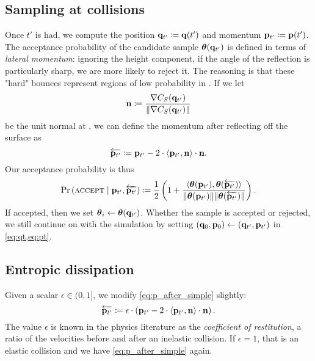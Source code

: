 \subsection{Sampling at collisions} \label{ss:sampling}

Once $t'$ is had, we compute the position $\mathbf{q}_{t'} \coloneqq \mathbf{q}(t')$ and
momentum $\mathbf{p}_{t'} \coloneqq \mathbf{p}(t')$. The acceptance probability of the
candidate sample $\boldsymbol{\theta}(\mathbf{q}_{t'})$ is defined in terms of \emph{lateral
momentum}: ignoring the height component, if the angle of the reflection is
particularly sharp, we are more likely to reject it. The reasoning is that these
"hard" bounces represent regions of low probability in \target{}. If we let
\begin{equation*}
    \mathbf{n} \coloneqq \frac{\nabla C_{S}({\mathbf{q}_{t'}})}{\lVert \nabla C_{S}({\mathbf{q}_{t'}}) \rVert}
\end{equation*}
be the unit normal at , we can define the momentum after reflecting off
the surface as
\begin{equation}
    \overleftarrow{\mathbf{p}_{t'}} \coloneqq \mathbf{p}_{t'} - 2 \cdot \left<\mathbf{p}_{t'}, \mathbf{n}\right> \cdot \mathbf{n}. \label{eq:p_after_simple}
\end{equation}
Our acceptance probability is thus
\begin{equation}
    \Pr\left(\textsc{accept} \mid \mathbf{p}_{t'}, \overleftarrow{\mathbf{p}_{t'}} \right) 
    \coloneqq \frac{1}{2}
    \left(1 + \frac{
        \left<\boldsymbol{\theta}(\mathbf{p}_{t'}),\boldsymbol{\theta}(\overleftarrow{\mathbf{p}_{t'}})\right>
    }{
        \lVert \boldsymbol{\theta}(\mathbf{p}_{t'}) \rVert \lVert \boldsymbol{\theta}(\overleftarrow{\mathbf{p}_{t'}}) \rVert
    }\right).
\end{equation}
If accepted, then we set $\boldsymbol{\theta}_i \leftarrow \boldsymbol{\theta}(\mathbf{q}_{t'})$. Whether the
sample is accepted or rejected, we still continue on with the simulation
by setting $(\mathbf{q}_{0}{}, \mathbf{p}_{0}{}) \leftarrow (\mathbf{q}_{t'}, \mathbf{p}_{t'})$ in \cref{eq:qt,eq:pt}.

\subsection{Entropic dissipation} \label{ss:entropy}

Given a scalar $\epsilon \in (0,1]$, we modify \cref{eq:p_after_simple} slightly:
\begin{equation}
    \overleftarrow{\mathbf{p}_{t'}} \coloneqq \epsilon \cdot \left(\mathbf{p}_{t'} - 2 \cdot \left<\mathbf{p}_{t'}, \mathbf{n}\right> \cdot \mathbf{n}\right). \label{eq:p_after}
\end{equation}
The value $\epsilon$ is known in the physics literature as the \emph{coefficient
of restitution}, a ratio of the velocities before and after an inelastic
collision. If $\epsilon = 1$, that is an elastic collision and we have
\cref{eq:p_after_simple} again.

